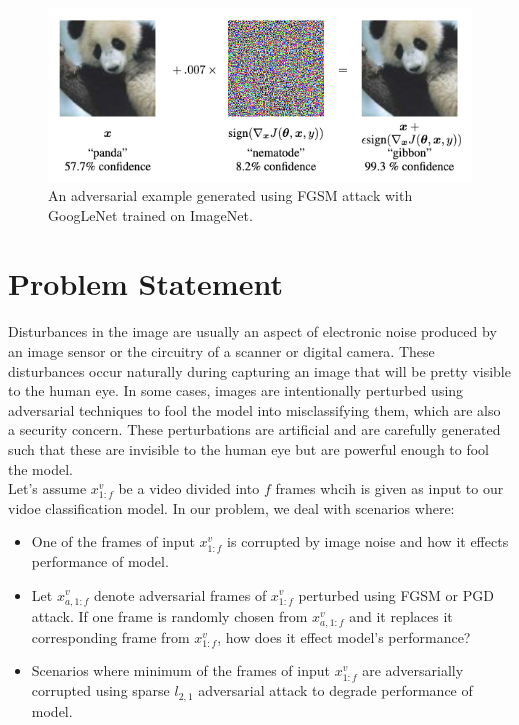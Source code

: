 \documentclass[10pt,twocolumn,letterpaper]{article}
\begin{document}
\begin{figure}[!ht]
	\centering
	\includegraphics[width=\columnwidth]{Images/Adversarial-Example.png}
	\caption{An adversarial example generated using FGSM attack with GoogLeNet trained on ImageNet.}
\end{figure}


\section{Problem Statement}
\label{sec:problem}
Disturbances in the image are usually an aspect of electronic noise produced by an image sensor or the circuitry of a scanner or digital camera. These disturbances occur naturally during capturing an image that will be pretty visible to the human eye. In some cases, images are intentionally perturbed using adversarial techniques to fool the model into misclassifying them, which are also a security concern. These perturbations are artificial and are carefully generated such that these are invisible to the human eye but are powerful enough to fool the model.\\

Let's assume $x_{1:f}^v$ be a video divided into $f$ frames whcih is given as input to our vidoe classification model. In our problem, we deal with scenarios where:
\begin{itemize}
\setlength\itemsep{0.01em}
\item One of the frames of input $x_{1:f}^v$ is corrupted by image noise and how it effects performance of model.
\item Let $x_{a,{1:f}}^v$ denote adversarial frames of $x_{1:f}^v$ perturbed using FGSM or PGD attack. If one frame is randomly chosen from $x_{a,{1:f}}^v$ and it replaces it corresponding frame from $x_{1:f}^v$, how does it effect model's performance?
\item Scenarios where minimum of the frames of input $x_{1:f}^v$ are adversarially corrupted using sparse $l_{2,1}$ adversarial attack to degrade performance of model.
\end{itemize}
\end{document}
